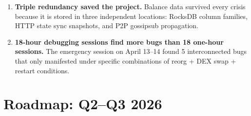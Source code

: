 \documentclass[12pt,a4paper]{article}
\begin{document}
\begin{enumerate}[leftmargin=*, label=\textbf{L\arabic*.}]
    \item \textbf{Triple redundancy saved the project.} Balance data survived every crisis because it is stored in three independent locations: RocksDB column families, HTTP state sync snapshots, and P2P gossipsub propagation.

    \item \textbf{18-hour debugging sessions find more bugs than 18 one-hour sessions.} The emergency session on April 13--14 found 5 interconnected bugs that only manifested under specific combinations of reorg + DEX swap + restart conditions.
\end{enumerate}

\section{Roadmap: Q2--Q3 2026}
\end{document}
